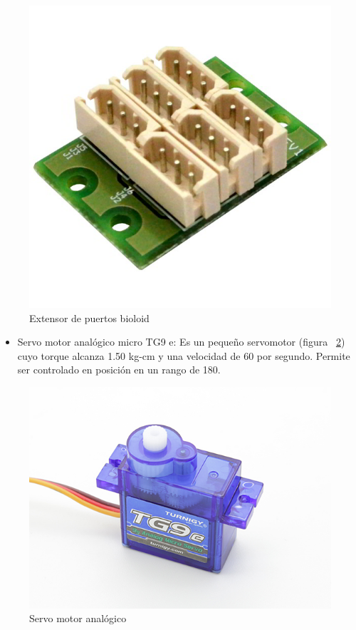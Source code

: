 \begin{figure}[hbtp]
\centering
\includegraphics[scale=0.1]{imagenes/Dynamixel-AX-MX-6-Port-Extension-Hub-600x600.jpg}


\caption{Extensor de puertos bioloid}
\label{fig:ext}
\end{figure}

\begin{itemize}
\item Servo motor anal\'ogico micro TG9 e: Es un pequeño servomotor  (figura ~\ref{fig:Servo}) cuyo torque alcanza 1.50 kg-cm y una velocidad de 60 por segundo. Permite ser controlado en posición en un rango de 180. \cite{microservo}  

\end{itemize}

\begin{figure}[hbtp]
\centering
\includegraphics[scale=0.1]{imagenes/turnigy.jpg}

\caption{Servo motor analógico}

\label{fig:Servo}
\end{figure}

